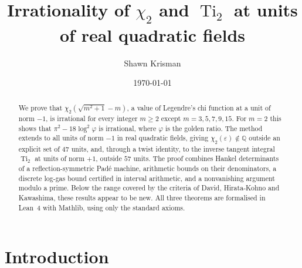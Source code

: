 \documentclass[11pt]{amsart}
\theoremstyle{definition}
\theoremstyle{remark}
\numberwithin{equation}{section}
\newcommand{\QQ}{\mathbb{Q}}
\newcommand{\eps}{\varepsilon}
\newcommand{\Ti}{\operatorname{Ti}}
\begin{document}
\title[$\chi_2$ and $\Ti_2$ at units of real quadratic fields]{Irrationality of \texorpdfstring{$\chi_2$}{chi\_2} and
\texorpdfstring{$\Ti_2$}{Ti\_2} at units of real quadratic fields}

\author{Shawn Krisman}


\date{\today}

\begin{abstract}
We prove that $\chi_2(\sqrt{m^2+1}-m)$, a value of Legendre's chi function at a unit of norm $-1$, is irrational for
every integer $m\ge2$ except $m=3,5,7,9,15$. For $m=2$ this shows that $\pi^2-18\log^2\varphi$ is irrational, where
$\varphi$ is the golden ratio. The method extends to all units of norm $-1$ in real quadratic fields, giving
$\chi_2(\eps)\notin\QQ$ outside an explicit set of $47$ units, and, through a twist identity, to the inverse tangent
integral $\Ti_2$ at units of norm $+1$, outside $57$ units. The proof combines Hankel determinants of a
reflection-symmetric Pad\'e machine, arithmetic bounds on their denominators, a discrete log-gas bound certified in
interval arithmetic, and a nonvanishing argument modulo a prime. Below the range covered by the criteria of David,
Hirata-Kohno and Kawashima, these results appear to be new. All three theorems are formalised in Lean~4 with Mathlib,
using only the standard axioms.
\end{abstract}

\maketitle

\tableofcontents

\section{Introduction}\label{sec:intro}
\end{document}
